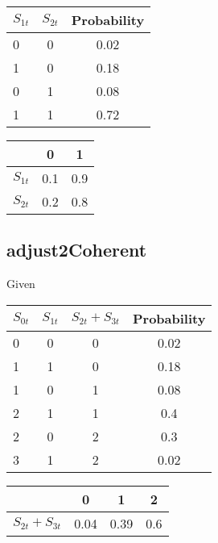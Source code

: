 \documentclass[12pt]{article}
\begin{document}
\vspace{10mm}
\begin{minipage}[t]{0.3\textwidth}
    \begin{tabular}{lcc}
        \hline
        $S_{1t}$ & $S_{2t}$ &  Probability\\\hline
         0 & 0 &  0.02\\
         1 & 0 &  0.18 \\
         0 & 1 &  0.08 \\
         1 & 1 &  0.72 \\\hline
    \end{tabular}
\end{minipage}%
\begin{minipage}[t]{.3\textwidth}
    \begin{tabular}{lcc}
        \hline
            & 0 & 1\\\hline
        $S_{1t}$ & 0.1 & 0.9   \\
        $S_{2t}$ & 0.2 & 0.8   \\\hline
    \end{tabular}
\end{minipage}%


\subsection{adjust2Coherent}
\label{adjust2Coherent}

Given

\vspace{4mm}
\begin{minipage}[t]{0.4\textwidth}
    \begin{tabular}{lccc}
        \hline
        $S_{0t}$ & $S_{1t}$ & $S_{2t}+S_{3t}$ & Probability\\\hline
        0 & 0 & 0 &  0.02\\
        1 & 1 & 0 &  0.18 \\
        1 & 0 & 1 &  0.08 \\
        2 & 1 & 1 &  0.4\\
        2 & 0 & 2 &  0.3\\
        3 & 1 & 2 &  0.02\\\hline
    \end{tabular}
\end{minipage}%
\begin{minipage}[t]{.4\textwidth}
    \begin{tabular}{lccc}
        \hline
            & 0 & 1 & 2\\\hline
        $S_{2t}+S_{3t}$ & 0.04 & 0.39 &  0.6  \\\hline
    \end{tabular}
\end{minipage}%
\vspace{3mm}
\end{document}
